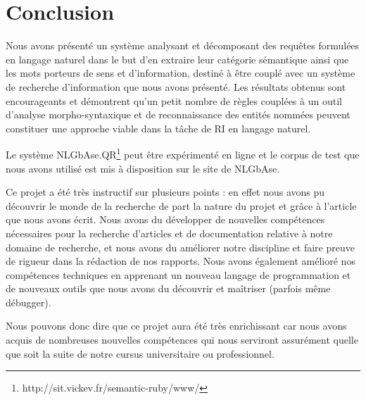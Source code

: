 \documentclass[10pt,a4paper]{article}
\begin{document}
\section{Conclusion}
\par Nous avons présenté un système analysant et décomposant des requêtes formulées en langage naturel dans le but d'en extraire leur catégorie sémantique ainsi que les mots porteurs de sens et d'information, destiné à être couplé avec un système de recherche d'information que nous avons présenté. Les résultats obtenus sont encourageants et démontrent qu'un petit nombre de règles couplées à un outil d'analyse morpho-syntaxique et de reconnaissance des entités nommées peuvent constituer une approche viable dans la tâche de RI en langage naturel.%
\par Le système NLGbAse.QR\footnote{http://sit.vickev.fr/semantic-ruby/www/} peut être expérimenté en ligne et le corpus de test que nous avons utilisé est mis à disposition sur le site de NLGbAse.
\par Ce projet a été très instructif sur plusieurs points : en effet nous avons pu découvrir le monde de la recherche de part la nature du projet et grâce à l'article que nous avons écrit. Nous avons du développer de nouvelles compétences nécessaires pour la recherche d'articles et de documentation relative à notre domaine de recherche, et nous avons du améliorer notre discipline et faire preuve de rigueur dans la rédaction de nos rapports. Nous avons également amélioré nos compétences techniques en apprenant un nouveau langage de programmation et de nouveaux outils que nous avons du découvrir et maîtriser (parfois même débugger).
\par Nous pouvons donc dire que ce projet aura été très enrichissant car nous avons acquis de nombreuses nouvelles compétences qui nous serviront assurément quelle que soit la suite de notre cursus universitaire ou professionnel.




\end{document}
